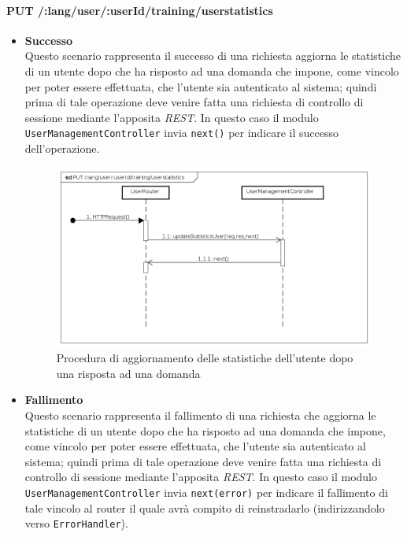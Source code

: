 \paragraph{PUT /:lang/user/:userId/training/userstatistics} %
\begin{itemize}
\item \textbf{Successo}\\
Questo scenario rappresenta il successo di una richiesta aggiorna le statistiche di un utente dopo che ha risposto ad una domanda che impone, come vincolo per poter essere effettuata, che l'utente sia autenticato al sistema; quindi prima di tale operazione deve venire fatta una richiesta di controllo di sessione mediante l'apposita \textit{REST}. In questo caso il modulo \texttt{UserManagementController} invia \texttt{next()} per indicare il successo dell'operazione.

\begin{figure}[ht]
	\centering
	\includegraphics[scale=0.45]{UML/DiagrammiDiSequenza/Back-end/PUT__lang_user__userId_training_userstatistics_success.png}
	\caption{Procedura di aggiornamento delle statistiche dell'utente dopo una risposta ad una domanda}
\end{figure}
\FloatBarrier

\item \textbf{Fallimento}\\
Questo scenario rappresenta il fallimento di una richiesta che aggiorna le statistiche di un utente dopo che ha risposto ad una domanda che impone, come vincolo per poter essere effettuata, che l'utente sia autenticato al sistema; quindi prima di tale operazione deve venire fatta una richiesta di controllo di sessione mediante l'apposita \textit{REST}. In questo caso il modulo \texttt{UserManagementController} invia \texttt{next(error)} per indicare il fallimento di tale vincolo al router il quale avrà compito di reinstradarlo (indirizzandolo verso \texttt{ErrorHandler}).


\end{itemize}
